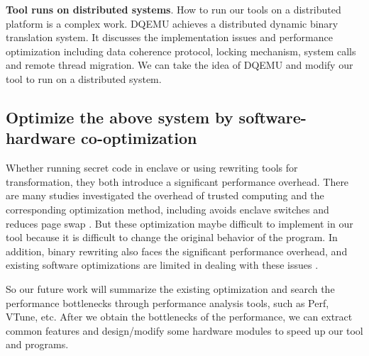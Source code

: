 \textbf{Tool runs on distributed systems}.
How to run our tools on a distributed platform is a complex work.
DQEMU \cite{Zhao2020DQEMUAS} achieves a distributed dynamic binary translation system.
It discusses the implementation issues and performance optimization including
data coherence protocol, locking mechanism, system calls and remote thread migration.
We can take the idea of DQEMU and modify our tool to run on a distributed system.

\subsection{Optimize the above system by software-hardware co-optimization}
Whether running secret code in enclave or using rewriting tools for transformation,
they both introduce a significant performance overhead.
There are many studies investigated the overhead of trusted computing and 
the corresponding optimization method, including avoids enclave switches \cite{Tian2018SwitchlessCM}
and reduces page swap \cite{Orenbach2017EleosEO, Taassori2018VAULTRP}. But these optimization
maybe difficult to implement in our tool because it is difficult to change the
original behavior of the program. 
In addition, binary rewriting also faces the significant performance overhead, and existing
software optimizations are limited in dealing with these issues \cite{Kim2003HardwareSF}.

So our future work will summarize the existing optimization and search the performance
bottlenecks through performance analysis tools, such as Perf, VTune, etc.
After we obtain the bottlenecks of the performance, we can extract common features
and design/modify some hardware modules to speed up our tool and programs.